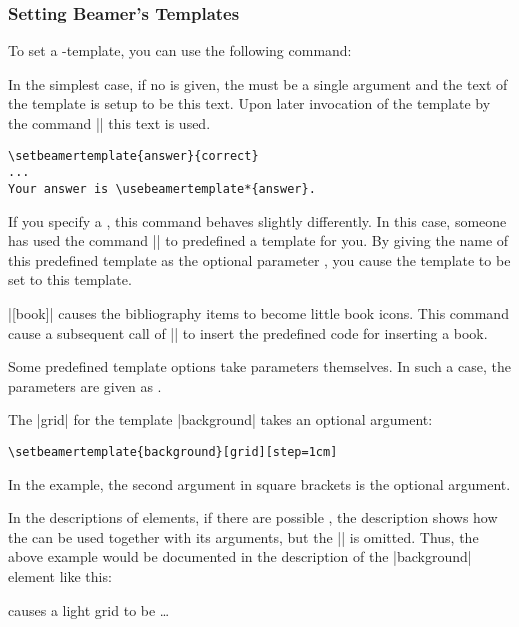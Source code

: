\subsubsection{Setting Beamer's Templates}

To set  a \beamer-template, you can use the following command:

\begin{command}{\setbeamertemplate{}}
  In the simplest case, if no  is given, the
   must be a single argument and the text of the template
   is setup to be this text. Upon later invocation
  of the template by the command |\usebeamertemplate| this text is
  used.

  \example
\begin{verbatim}
\setbeamertemplate{answer}{correct}
...
Your answer is \usebeamertemplate*{answer}.
\end{verbatim}

  If you specify a , this command behaves
  slightly differently. In this case, someone has used the command
  || to predefined a template for you. By giving the
  name of this predefined template as the optional parameter
  , you cause the template 
  to be set to this template.

  \example |[book]| causes the
  bibliography items to become little book icons. This command cause a
  subsequent call of || to insert
  the predefined code for inserting a book.

  Some predefined template options take parameters themselves. In such
  a case, the parameters are given as .

  \example
  The  |grid| for the template |background|
  takes an optional argument:
\begin{verbatim}
\setbeamertemplate{background}[grid][step=1cm]
\end{verbatim}
  In the example, the second argument in square brackets is the
  optional argument.

  In the descriptions of elements, if there are possible
  , the description shows how the
   can be used together with its arguments,
  but the || is omitted. Thus, the above
  example would be documented in the description of the |background|
  element like this:
  \begin{itemize}
     causes a light grid to be
    \dots
  \end{itemize}
\end{command}


